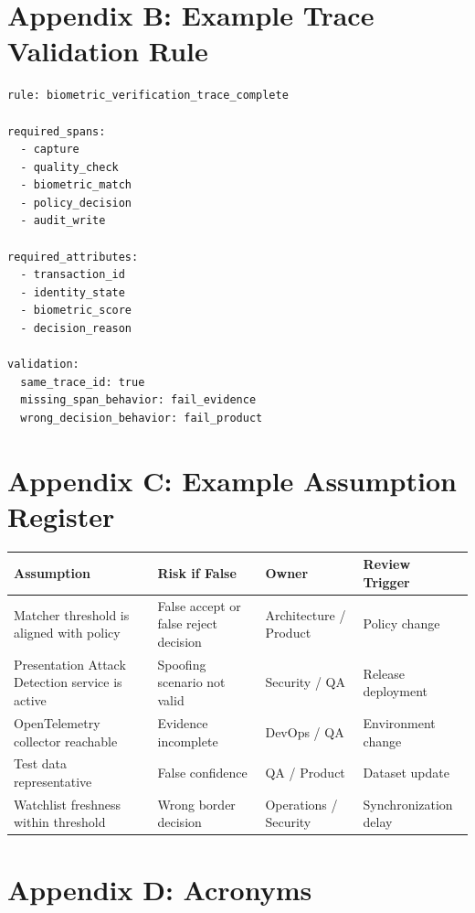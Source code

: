 \documentclass[11pt,a4paper]{article}
\begin{document}
\section{Appendix B: Example Trace Validation Rule}

\begin{lstlisting}
rule: biometric_verification_trace_complete

required_spans:
  - capture
  - quality_check
  - biometric_match
  - policy_decision
  - audit_write

required_attributes:
  - transaction_id
  - identity_state
  - biometric_score
  - decision_reason

validation:
  same_trace_id: true
  missing_span_behavior: fail_evidence
  wrong_decision_behavior: fail_product
\end{lstlisting}

\section{Appendix C: Example Assumption Register}

\begin{longtable}{p{3cm}p{4cm}p{3cm}p{3cm}}
\toprule
\textbf{Assumption} & \textbf{Risk if False} & \textbf{Owner} & \textbf{Review Trigger} \\
\midrule
Matcher threshold is aligned with policy & False accept or false reject decision & Architecture / Product & Policy change \\
Presentation Attack Detection service is active & Spoofing scenario not valid & Security / QA & Release deployment \\
OpenTelemetry collector reachable & Evidence incomplete & DevOps / QA & Environment change \\
Test data representative & False confidence & QA / Product & Dataset update \\
Watchlist freshness within threshold & Wrong border decision & Operations / Security & Synchronization delay \\
\bottomrule
\end{longtable}

\section{Appendix D: Acronyms}
\end{document}
